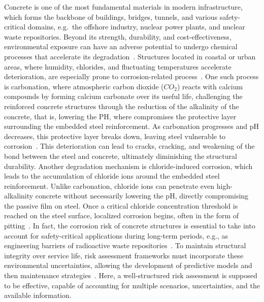 
Concrete is one of the most fundamental materials in modern infrastructure, which forms the backbone of buildings, bridges, tunnels, and various safety-critical domains, e.g.~the offshore industry, nuclear power plants, and nuclear waste repositories.
Beyond its strength, durability, and cost-effectiveness, environmental exposure can have an adverse potential to undergo chemical processes that accelerate its degradation~\cite{GLASSER2008226}. Structures located in coastal or urban areas, where humidity, chlorides, and fluctuating temperatures accelerate deterioration, are especially prone to corrosion-related process~\cite{qu2021durability}.
One such process is carbonation, where atmospheric carbon dioxide ($CO_2$) reacts with calcium compounds by forming calcium carbonate over its useful life, challenging the reinforced concrete structures through the reduction of the alkalinity of the concrete, that is, lowering the PH, where compromises the protective layer surrounding the embedded steel reinforcement.
As carbonation progresses and pH decreases, this protective layer breaks down, leaving steel vulnerable to corrosion~\cite{carbonation}.
This deterioration can lead to cracks, cracking, and weakening of the bond between the steel and concrete, ultimately diminishing the structural durability.
Another degradation mechanism is chloride-induced corrosion, which leads to the accumulation of chloride ions around the embedded steel reinforcement. Unlike carbonation, chloride ions can penetrate even high-alkalinity concrete without necessarily lowering the pH, directly compromising the passive film on steel.
Once a critical chloride concentration threshold is reached on the steel surface, localized corrosion begins, often in the form of pitting~\cite{shi2012durability}.
In fact, the corrosion risk of concrete structures is essential to take into account for safety-critical applications during long-term periods, e.g., as engineering barriers of radioactive waste repositories~\cite{walton1990models}.
To maintain structural integrity over service life, risk assessment frameworks must incorporate these environmental uncertainties, allowing the development of predictive models and then maintenance strategies~\cite{lindborg2018climate}.
Here, a well-structured risk assessment is supposed to be effective, capable of accounting for multiple scenarios, uncertainties, and the available information.\\

